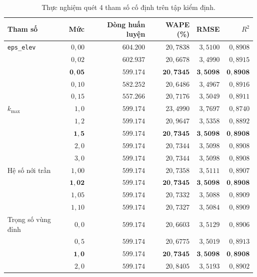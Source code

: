 \documentclass[12pt, a4paper]{report}
\begin{document}
\begin{table}[htbp]
\centering
\caption{Thực nghiệm quét 4 tham số cố định trên tập kiểm định.}
\label{tab:quet_tham_so}
\small
\begin{tabular}{l r r r r r}
\toprule
\textbf{Tham số} & \textbf{Mức} & \textbf{Dòng huấn luyện} & \textbf{WAPE (\%)} & \textbf{RMSE} & \textbf{$R^2$} \\
\midrule
\texttt{eps\_elev}
 & $0{,}00$ & $604.200$ & $20{,}7838$ & $3{,}5100$ & $0{,}8908$ \\
 & $0{,}02$ & $602.937$ & $20{,}6678$ & $3{,}4990$ & $0{,}8915$ \\
 & $\mathbf{0{,}05}$ & $\mathbf{599.174}$ & $\mathbf{20{,}7345}$ & $\mathbf{3{,}5098}$ & $\mathbf{0{,}8908}$ \\
 & $0{,}10$ & $582.252$ & $20{,}6486$ & $3{,}4967$ & $0{,}8916$ \\
 & $0{,}15$ & $557.266$ & $20{,}7176$ & $3{,}5049$ & $0{,}8911$ \\
\midrule
$k_{\max}$
 & $1{,}0$ & $599.174$ & $23{,}4990$ & $3{,}7697$ & $0{,}8740$ \\
 & $1{,}2$ & $599.174$ & $20{,}9647$ & $3{,}5358$ & $0{,}8892$ \\
 & $\mathbf{1{,}5}$ & $\mathbf{599.174}$ & $\mathbf{20{,}7345}$ & $\mathbf{3{,}5098}$ & $\mathbf{0{,}8908}$ \\
 & $2{,}0$ & $599.174$ & $20{,}7344$ & $3{,}5098$ & $0{,}8908$ \\
 & $3{,}0$ & $599.174$ & $20{,}7344$ & $3{,}5098$ & $0{,}8908$ \\
\midrule
Hệ số nới trần
 & $1{,}00$ & $599.174$ & $20{,}7358$ & $3{,}5111$ & $0{,}8907$ \\
 & $\mathbf{1{,}02}$ & $\mathbf{599.174}$ & $\mathbf{20{,}7345}$ & $\mathbf{3{,}5098}$ & $\mathbf{0{,}8908}$ \\
 & $1{,}05$ & $599.174$ & $20{,}7332$ & $3{,}5088$ & $0{,}8909$ \\
 & $1{,}10$ & $599.174$ & $20{,}7327$ & $3{,}5084$ & $0{,}8909$ \\
\midrule
Trọng số vùng đỉnh
 & $0{,}0$ & $599.174$ & $20{,}6603$ & $3{,}5129$ & $0{,}8906$ \\
 & $0{,}5$ & $599.174$ & $20{,}6775$ & $3{,}5019$ & $0{,}8913$ \\
 & $\mathbf{1{,}0}$ & $\mathbf{599.174}$ & $\mathbf{20{,}7345}$ & $\mathbf{3{,}5098}$ & $\mathbf{0{,}8908}$ \\
 & $2{,}0$ & $599.174$ & $20{,}8405$ & $3{,}5193$ & $0{,}8902$ \\
\bottomrule
\end{tabular}
\end{table}
\end{document}
